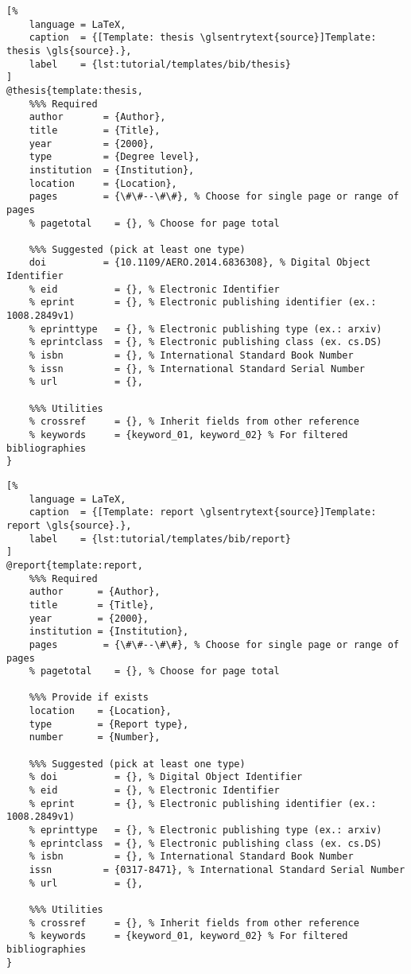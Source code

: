\newpage
\begin{lstlisting}[%
    language = LaTeX,
    caption  = {[Template: thesis \glsentrytext{source}]Template: thesis \gls{source}.},
    label    = {lst:tutorial/templates/bib/thesis}
]
@thesis{template:thesis,
    %%% Required
    author       = {Author},
    title        = {Title},
    year         = {2000},
    type         = {Degree level},
    institution  = {Institution},
    location     = {Location},
    pages        = {\#\#--\#\#}, % Choose for single page or range of pages
    % pagetotal    = {}, % Choose for page total
    
    %%% Suggested (pick at least one type)
    doi          = {10.1109/AERO.2014.6836308}, % Digital Object Identifier
    % eid          = {}, % Electronic Identifier
    % eprint       = {}, % Electronic publishing identifier (ex.: 1008.2849v1)
    % eprinttype   = {}, % Electronic publishing type (ex.: arxiv)
    % eprintclass  = {}, % Electronic publishing class (ex. cs.DS)
    % isbn         = {}, % International Standard Book Number
    % issn         = {}, % International Standard Serial Number
    % url          = {},
    
    %%% Utilities
    % crossref     = {}, % Inherit fields from other reference
    % keywords     = {keyword_01, keyword_02} % For filtered bibliographies
}
\end{lstlisting}

\newpage
\begin{lstlisting}[%
    language = LaTeX,
    caption  = {[Template: report \glsentrytext{source}]Template: report \gls{source}.},
    label    = {lst:tutorial/templates/bib/report}
]
@report{template:report,
    %%% Required
    author      = {Author},
    title       = {Title},
    year        = {2000},
    institution = {Institution},
    pages        = {\#\#--\#\#}, % Choose for single page or range of pages
    % pagetotal    = {}, % Choose for page total
    
    %%% Provide if exists
    location    = {Location},
    type        = {Report type},
    number      = {Number},
    
    %%% Suggested (pick at least one type)
    % doi          = {}, % Digital Object Identifier
    % eid          = {}, % Electronic Identifier
    % eprint       = {}, % Electronic publishing identifier (ex.: 1008.2849v1)
    % eprinttype   = {}, % Electronic publishing type (ex.: arxiv)
    % eprintclass  = {}, % Electronic publishing class (ex. cs.DS)
    % isbn         = {}, % International Standard Book Number
    issn         = {0317-8471}, % International Standard Serial Number
    % url          = {},
    
    %%% Utilities
    % crossref     = {}, % Inherit fields from other reference
    % keywords     = {keyword_01, keyword_02} % For filtered bibliographies
}
\end{lstlisting}

